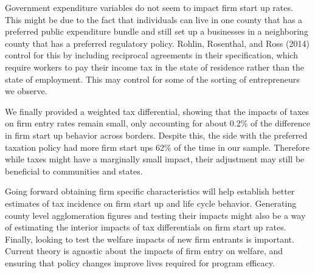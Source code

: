 Government expenditure variables do not seem to impact firm start up rates. This might be due to the fact that individuals can live in one county that has a preferred public expenditure bundle and still set up a businesses in a neighboring county that has a preferred regulatory policy. Rohlin, Rosenthal, and Ross (2014) control for this by including reciprocal agreements in their specification, which require workers to pay their income tax in the state of residence rather than the state of employment. This may control for some of the sorting of entrepreneurs we observe.

We finally provided a weighted tax differential, showing that the impacts of taxes on firm entry rates remain small, only accounting for about 0.2\% of the difference in firm start up behavior across borders. Despite this, the side with the preferred taxation policy had more firm start ups 62\% of the time in our sample. Therefore while taxes might have a marginally small impact, their adjustment may still be beneficial to communities and states. 

Going forward obtaining firm specific characteristics will help establish better estimates of tax incidence on firm start up and life cycle behavior. Generating county level agglomeration figures and testing their impacts might also be a way of estimating the interior impacts of tax differentials on firm start up rates. Finally, looking to test the welfare impacts of new firm entrants is important. Current theory is agnostic about the impacts of firm entry on welfare, and ensuring that policy changes improve lives required for program efficacy.